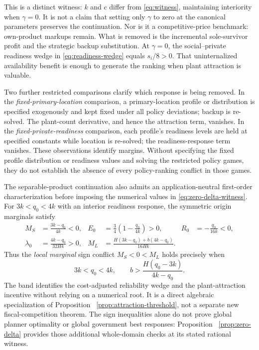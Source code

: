This is a distinct witness: $k$ and $c$ differ from \eqref{eq:witness}, maintaining interiority when $\gamma=0$. It is not a claim that setting only $\gamma$ to zero at the canonical parameters preserves the continuation. Nor is it a competitive-price benchmark: own-product markups remain. What is removed is the incremental sole-survivor profit and the strategic backup substitution. At $\gamma=0$, the social--private readiness wedge in \eqref{eq:readiness-wedge} equals $s_i/8>0$. That uninternalized availability benefit is enough to generate the ranking when plant attraction is valuable.

Two further restricted comparisons clarify which response is being removed. In the \emph{fixed-primary-location} comparison, a primary-location profile or distribution is specified exogenously and kept fixed under all policy deviations; backup is re-solved. The plant-count derivative, and hence the attraction term, vanishes. In the \emph{fixed-private-readiness} comparison, each profile's readiness levels are held at specified constants while location is re-solved; the readiness-response term vanishes. These observations identify margins. Without specifying the fixed profile distribution or readiness values and solving the restricted policy games, they do not establish the absence of every policy-ranking conflict in those games.


\begin{remark}[Transparent primitive band at $\Delta=0$]
\label{rem:zero-delta-primitive-band}
The separable-product continuation also admits an application-neutral
first-order characterization before imposing the numerical values in
\eqref{eq:zero-delta-witness}. For $3k<q_0<4k$ with an interior
readiness response, the symmetric origin marginals satisfy
\begin{align*}
M_S&=\frac{3k-q_0}{4k}<0,
&
E_0&=\frac34\left(1-\frac{q_0}{4k}\right)>0,
&
R_0&=-\frac{q_0}{16k}<0,\\
\lambda_0&=\frac{4k-q_0}{32Hk}>0,
&
M_L&=\frac{H(3k-q_0)+b(4k-q_0)}{16Hk}.
\end{align*}
Thus the \emph{local marginal} sign conflict $M_S<0<M_L$
holds precisely when
\begin{equation}
3k<q_0<4k,\qquad
b>\frac{H(q_0-3k)}{4k-q_0}.
\label{eq:zero-delta-primitive-band}
\end{equation}
The band identifies the cost-adjusted reliability wedge and the
plant-attraction incentive without relying on a numerical root.
It is a direct algebraic specialization of Proposition~
\ref{prop:attraction-threshold}, not a separate new fiscal-competition
theorem. The sign inequalities alone do not prove global planner
optimality or global government best responses: Proposition~
\ref{prop:zero-delta} provides those additional whole-domain checks
at its stated rational witness.
\end{remark}


